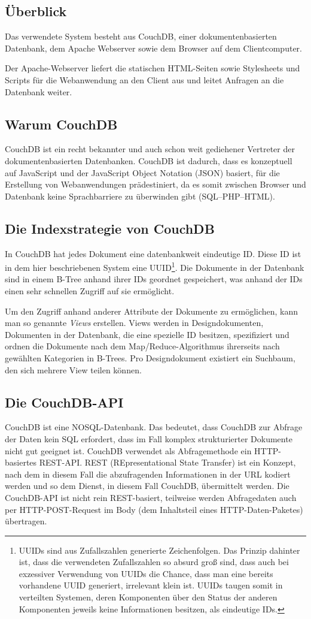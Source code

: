 \documentclass[12pt,ngerman,a4]{scrartcl}
\newcommand{\pquote}[1]{\glqq #1\grqq}
\begin{document}
\subsection{Überblick}
Das verwendete System besteht aus CouchDB, einer dokumentenbasierten Datenbank, dem Apache Webserver sowie dem Browser auf dem Clientcomputer.

Der Apache-Webserver liefert die statischen HTML-Seiten sowie Stylesheets und Scripts für die Webanwendung an den Client aus und leitet Anfragen an die Datenbank weiter.
\subsection{Warum CouchDB}
CouchDB ist ein recht bekannter und auch schon weit gediehener Vertreter der dokumentenbasierten Datenbanken. CouchDB ist dadurch, dass es konzeptuell auf JavaScript und der JavaScript Object Notation (JSON) basiert, für die Erstellung von Webanwendungen prädestiniert, da es somit zwischen Browser und Datenbank keine \pquote{Sprachbarriere} zu überwinden gibt (SQL--PHP--HTML).
\subsection{Die Indexstrategie von CouchDB}
In CouchDB hat jedes Dokument eine datenbankweit eindeutige ID. Diese ID ist in dem hier beschriebenen System eine UUID\footnote{UUIDs sind aus Zufallszahlen generierte Zeichenfolgen. Das Prinzip dahinter ist, dass die verwendeten Zufallszahlen so absurd groß sind, dass auch bei exzessiver Verwendung von UUIDs die Chance, dass man eine bereits vorhandene UUID generiert, irrelevant klein ist. UUIDs taugen somit in verteilten Systemen, deren Komponenten über den Status der anderen Komponenten jeweils keine Informationen besitzen, als eindeutige IDs.}. Die Dokumente in der Datenbank sind in einem B-Tree anhand ihrer IDs geordnet gespeichert, was anhand der IDs einen sehr schnellen Zugriff auf sie ermöglicht.

Um den Zugriff anhand anderer Attribute der Dokumente zu ermöglichen, kann man so genannte \emph{Views} erstellen. Views werden in Designdokumenten, Dokumenten in der Datenbank, die eine spezielle ID besitzen, spezifiziert und ordnen die Dokumente nach dem Map/Reduce-Algorithmus %
ihrerseits nach gewählten Kategorien in B-Trees. Pro Designdokument existiert ein Suchbaum, den sich mehrere View teilen können.
\subsection{Die CouchDB-API}
CouchDB ist eine NOSQL-Datenbank. Das bedeutet, dass CouchDB zur Abfrage der Daten kein SQL erfordert, dass im Fall komplex strukturierter Dokumente nicht gut geeignet ist. CouchDB verwendet als Abfragemethode ein HTTP-basiertes REST-API. REST (REpresentational State Transfer) ist ein Konzept, nach dem in diesem Fall die abzufragenden Informationen in der URL kodiert werden und so dem Dienst, in diesem Fall CouchDB, übermittelt werden. Die CouchDB-API ist nicht rein REST-basiert, teilweise werden Abfragedaten auch per HTTP-POST-Request im Body (dem Inhaltsteil eines HTTP-Daten-\pquote{Paketes}) übertragen.
\end{document}

